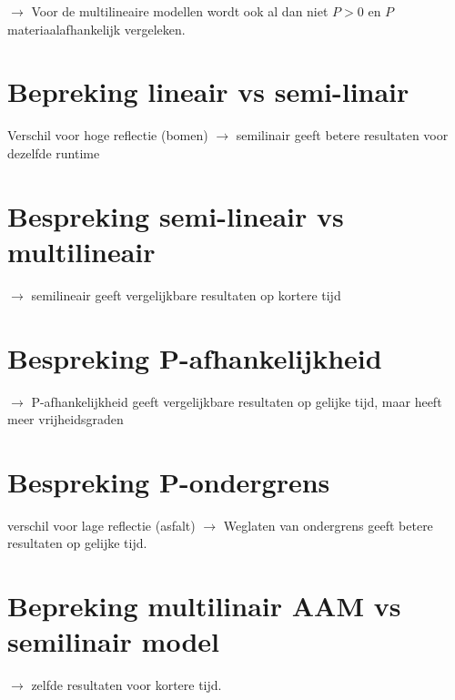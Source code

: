 \documentclass[12pt]{report}
\begin{document}
$\rightarrow$ Voor de multilineaire modellen wordt ook al dan niet $P> 0$ en $P$ materiaalafhankelijk vergeleken.



\section{Bepreking lineair vs semi-linair}

Verschil voor hoge reflectie (bomen)
$\rightarrow$ semilinair geeft betere resultaten voor dezelfde runtime

\section{Bespreking semi-lineair vs multilineair}

$\rightarrow$ semilineair geeft vergelijkbare resultaten op kortere tijd

\section{Bespreking P-afhankelijkheid}

$\rightarrow$ P-afhankelijkheid geeft vergelijkbare resultaten op gelijke tijd, maar heeft meer vrijheidsgraden

\section{Bespreking P-ondergrens}

verschil voor lage reflectie (asfalt)
$\rightarrow$ Weglaten van ondergrens geeft betere resultaten op gelijke tijd.

\section{Bepreking multilinair AAM vs semilinair model}

$\rightarrow$ zelfde resultaten voor kortere tijd.

\begin{appendices}


\end{appendices}


\begin{flushleft}
\nocite{*}
{}


\end{flushleft}
\end{document}
